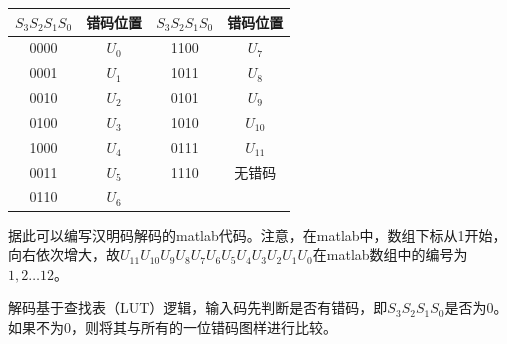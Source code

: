 \documentclass[UTF8]{ctexart}
\begin{document}
\begin{table}[H]
    \centering
    \begin{tabular}{|c|c|c|c|}
    \hline
    $S_3S_2S_1S_0$ & 错码位置  & $S_3S_2S_1S_0$ & 错码位置     \\ \hline
    0000           & $U_0$ & 1100           & $U_7$    \\ \hline
    0001           & $U_1$ & 1011           & $U_8$    \\ \hline
    0010           & $U_2$ & 0101           & $U_9$    \\ \hline
    0100           & $U_3$ & 1010           & $U_{10}$ \\ \hline
    1000           & $U_4$ & 0111           & $U_{11}$ \\ \hline
    0011           & $U_5$ & 1110           & 无错码      \\ \hline
    0110           & $U_6$ &                &          \\ \hline
    \end{tabular}
\end{table}

据此可以编写汉明码解码的matlab代码。注意，在matlab中，数组下标从1开始，向右依次增大，故$U_{11} U_{10} U_9 U_8 U_7 U_6 U_5 U_4 U_3 U_2 U_1 U_0$在matlab数组中的编号为$1,2 \dots 12$。

解码基于查找表（LUT）逻辑，输入码先判断是否有错码，即$S_3 S_2 S_1 S_0$是否为0。如果不为0，则将其与所有的一位错码图样进行比较。
\end{document}
